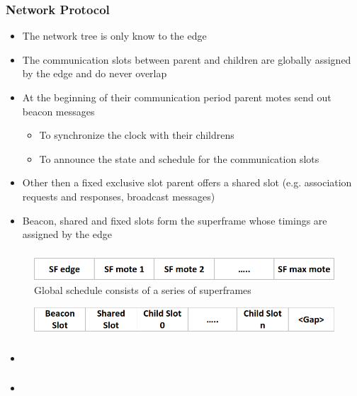 \begin{frame}[fragile]
  \frametitle{Network Protocol}
  \begin{itemize}
    \item The network tree is only know to the edge
    \item The communication slots between parent and children are globally assigned by the edge and do never overlap
    \item At the beginning of their communication period parent motes send out beacon messages
    \begin{itemize}
      \item To synchronize the clock with their childrens
      \item To announce the state and schedule for the communication slots
    \end{itemize}
    \item Other then a fixed exclusive slot parent offers a shared slot (e.g. association requests and responses, broadcast messages)
    \item Beacon, shared and fixed slots form the superframe whose timings are assigned by the edge
  \end{itemize}
\end{frame}

\begin{frame}
  \frametitle{}
  \begin{figure}
    \includegraphics[width=.9\textwidth]{img/6low_scheduling.png}
    \caption{Global schedule consists of a series of superframes}
  \end{figure}
  \begin{figure}
    \includegraphics[width=.9\textwidth]{img/6low_superframe.png}
  \end{figure}
\end{frame}

\begin{frame}
  \frametitle{}
  \begin{itemize}
    \item 
  \end{itemize}
\end{frame}

\begin{frame}
  \frametitle{}
  \begin{itemize}
    \item 
  \end{itemize}
\end{frame}